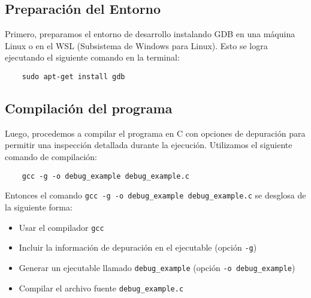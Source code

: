 \documentclass[12pt,a4paper]{article}
\begin{document}
\subsection{Preparación del Entorno}
Primero, preparamos el entorno de desarrollo instalando GDB en una máquina Linux o en el WSL (Subsistema de Windows para Linux). Esto se logra ejecutando el siguiente comando en la terminal:

\begin{center}
\begin{verbatim}
	sudo apt-get install gdb
\end{verbatim}	
\end{center}

\subsection{Compilación del programa}
Luego, procedemos a compilar el programa en C con opciones de depuración para permitir una inspección detallada durante la ejecución. Utilizamos el siguiente comando de compilación:
\begin{center}
\begin{verbatim}
	gcc -g -o debug_example debug_example.c
\end{verbatim}	
\end{center}
Entonces el comando \texttt{gcc -g -o debug\_example debug\_example.c} se desglosa de la siguiente forma:
\begin{itemize}
\item Usar el compilador \texttt{gcc}
\item Incluir la información de depuración en el ejecutable (opción \texttt{-g})
\item Generar un ejecutable llamado \texttt{debug\_example} (opción \texttt{-o debug\_example})
\item Compilar el archivo fuente \texttt{debug\_example.c}
\end{itemize}
\end{document}
